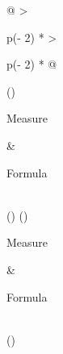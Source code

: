 \documentclass[
]{article}
\begin{document}
\begin{longtable}[]{@{}
  >{\raggedright\arraybackslash}p{(\columnwidth - 2\tabcolsep) * }
  >{\raggedright\arraybackslash}p{(\columnwidth - 2\tabcolsep) * }@{}}
\caption{\label{tab:variation} Common measures of variation. \(N\) refers to the number of data points.}\tabularnewline
\toprule()
\begin{minipage}[b]{\linewidth}\raggedright
Measure
\end{minipage} & \begin{minipage}[b]{\linewidth}\raggedright
Formula
\end{minipage} \\
\midrule()
\endfirsthead
\toprule()
\begin{minipage}[b]{\linewidth}\raggedright
Measure
\end{minipage} & \begin{minipage}[b]{\linewidth}\raggedright
Formula
\end{minipage} \\
\midrule()
\endhead

\end{longtable}
\end{document}
